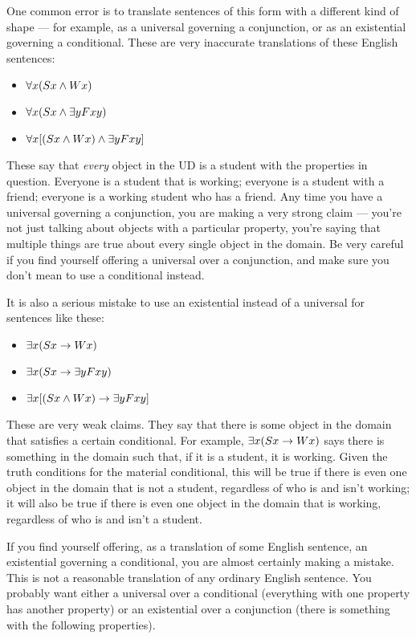 One common error is to translate sentences of this form with a different kind of shape --- for example, as a universal governing a conjunction, or as an existential governing a conditional. These are very inaccurate translations of these English sentences:

\begin{itemize}
\item $\forall x (Sx \wedge Wx)$
\item $\forall x (Sx \wedge \exists y Fxy)$
\item $\forall x [(Sx \wedge Wx) \wedge \exists y Fxy]$
\end{itemize}

These say that \emph{every} object in the UD is a student with the properties in question. Everyone is a student that is working; everyone is a student with a friend; everyone is a working student who has a friend. Any time you have a universal governing a conjunction, you are making a very strong claim --- you're not just talking about objects with a particular property, you're saying that multiple things are true about every single object in the domain. Be very careful if you find yourself offering a universal over a conjunction, and make sure you don't mean to use a conditional instead.

It is also a serious mistake to use an existential instead of a universal for sentences like these:

\begin{itemize}
\item $\exists x (Sx \rightarrow Wx)$
\item $\exists x (Sx \rightarrow \exists y Fxy)$
\item $\exists x [(Sx \wedge Wx) \rightarrow \exists y Fxy]$
\end{itemize}

These are very weak claims. They say that there is some object in the domain that satisfies a certain conditional. For example, $\exists x (Sx \rightarrow Wx)$ says there is something in the domain such that, if it is a student, it is working. Given the truth conditions for the material conditional, this will be true if there is even one object in the domain that is not a student, regardless of who is and isn't working; it will also be true if there is even one object in the domain that is working, regardless of who is and isn't a student.

If you find yourself offering, as a translation of some English sentence, an existential governing a conditional, you are almost certainly making a mistake. This is not a reasonable translation of any ordinary English sentence. You probably want either a universal over a conditional (everything with one property has another property) or an existential over a conjunction (there is something with the following properties). 




